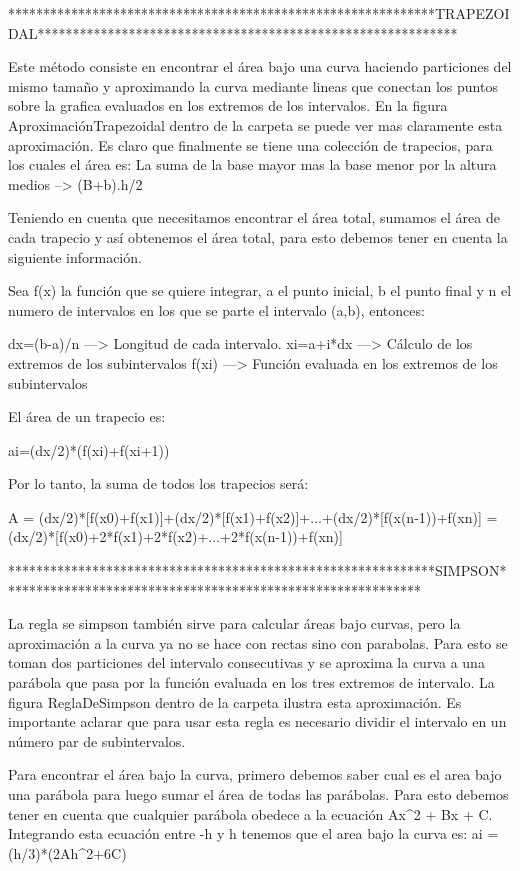 
*************************************************************TRAPEZOIDAL************************************************************

Este método consiste en encontrar el área bajo una curva haciendo particiones del mismo tamaño y aproximando la curva mediante lineas que conectan los puntos sobre la grafica evaluados en los extremos de los intervalos. En la figura AproximaciónTrapezoidal dentro de la carpeta se puede ver mas claramente esta aproximación.
Es claro que finalmente se tiene una colección de trapecios, para los cuales el área es: La suma de la base mayor mas la base menor por la altura medios --> (B+b).h/2

Teniendo en cuenta que necesitamos encontrar el área total, sumamos el área de cada trapecio y así obtenemos el área total, para esto debemos tener en cuenta la siguiente información.

Sea f(x) la función que se quiere integrar, a el punto inicial, b el punto final y n el numero de intervalos en los que se parte el intervalo (a,b), entonces:

dx=(b-a)/n ---> Longitud de cada intervalo.
xi=a+i*dx ---> Cálculo de los extremos de los subintervalos
f(xi) ---> Función evaluada en los extremos de los subintervalos

El área de un trapecio es:

ai=(dx/2)*(f(xi)+f(xi+1))

Por lo tanto, la suma de todos los trapecios será:

A = (dx/2)*[f(x0)+f(x1)]+(dx/2)*[f(x1)+f(x2)]+...+(dx/2)*[f(x(n-1))+f(xn)]
  = (dx/2)*[f(x0)+2*f(x1)+2*f(x2)+...+2*f(x(n-1))+f(xn)]

*************************************************************SIMPSON************************************************************

La regla se simpson también sirve para calcular áreas bajo curvas, pero la aproximación a la curva ya no se hace con rectas sino con parabolas. Para esto se toman dos particiones del intervalo consecutivas y se aproxima la curva a una parábola que pasa por la función evaluada en los tres extremos de intervalo. La figura ReglaDeSimpson dentro de la carpeta ilustra esta aproximación.
Es importante aclarar que para usar esta regla es necesario dividir el intervalo en un número par de subintervalos.

Para encontrar el área bajo la curva, primero debemos saber cual es el area bajo una parábola para luego sumar el área de todas las parábolas. Para esto debemos tener en cuenta que cualquier parábola obedece a la ecuación Ax^2 + Bx + C. Integrando esta ecuación entre -h y h tenemos que el area bajo la curva es:
ai = (h/3)*(2Ah^2+6C)

